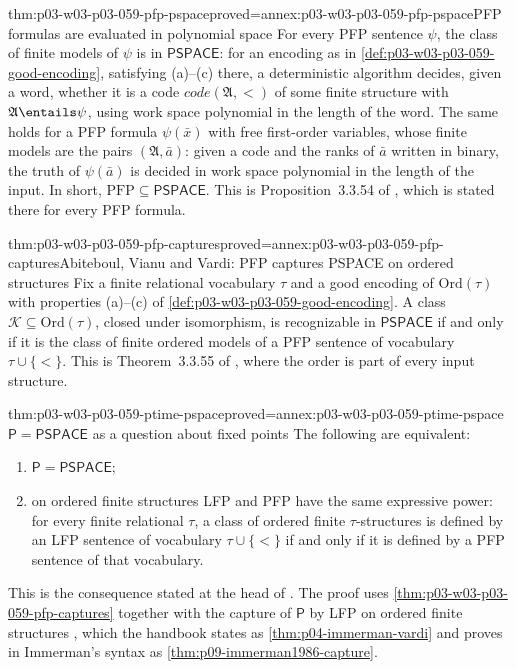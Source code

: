 \begin{hbtheorem}{thm:p03-w03-p03-059-pfp-pspace}{proved=annex:p03-w03-p03-059-pfp-pspace}{PFP formulas are evaluated in polynomial space}
For every PFP sentence \(\psi\), the class of finite models of \(\psi\) is
in \(\mathsf{PSPACE}\): for an encoding as in
\cref{def:p03-w03-p03-059-good-encoding}, satisfying (a)--(c) there, a
deterministic algorithm decides, given a word, whether it is a code
\(\mathit{code}(\mathfrak A,<)\) of some finite structure with
\(\mathfrak A\entails\psi\), using work space polynomial in the length of
the word. The same holds for a PFP formula \(\psi(\bar x)\) with free
first-order variables, whose finite models are the pairs
\((\mathfrak A,\bar a)\): given a code and the ranks of \(\bar a\) written in
binary, the truth of \(\psi(\bar a)\) is decided in work space polynomial in
the length of the input. In short, \(\mathrm{PFP}\subseteq\mathsf{PSPACE}\).
This is Proposition~3.3.54 of \cite[p.~178]{Gradel2007FMTDescriptiveChapter}, which is
stated there for every PFP formula.
\end{hbtheorem}

\begin{hbtheorem}{thm:p03-w03-p03-059-pfp-captures}{proved=annex:p03-w03-p03-059-pfp-captures}{Abiteboul, Vianu and Vardi: PFP captures PSPACE on ordered structures}
Fix a finite relational vocabulary \(\tau\) and a good encoding of
\(\mathrm{Ord}(\tau)\) with properties (a)--(c) of
\cref{def:p03-w03-p03-059-good-encoding}. A class \(\mathcal K\subseteq\mathrm{Ord}(\tau)\),
closed under isomorphism, is recognizable in \(\mathsf{PSPACE}\) if and only
if it is the class of finite ordered models of a PFP sentence of vocabulary
\(\tau\cup\{<\}\). This is Theorem~3.3.55 of
\cite[p.~178]{Gradel2007FMTDescriptiveChapter}, where the order is part of every input
structure.
\end{hbtheorem}

\begin{hbcorollary}{thm:p03-w03-p03-059-ptime-pspace}{proved=annex:p03-w03-p03-059-ptime-pspace}{\(\mathsf P=\mathsf{PSPACE}\) as a question about fixed points}
The following are equivalent:
\begin{enumerate}
 \item \(\mathsf P=\mathsf{PSPACE}\);
 \item on ordered finite structures LFP and PFP have the same expressive
       power: for every finite relational \(\tau\), a class of ordered
       finite \(\tau\)-structures is defined by an LFP sentence of
       vocabulary \(\tau\cup\{<\}\) if and only if it is defined by a PFP
       sentence of that vocabulary.
\end{enumerate}
This is the consequence stated at the head of \cite[p.~180]{Gradel2007FMTDescriptiveChapter}.
The proof uses \cref{thm:p03-w03-p03-059-pfp-captures} together with the
capture of \(\mathsf P\) by LFP on ordered finite structures
\cite[Theorem~3.3.16, p.~157]{Gradel2007FMTDescriptiveChapter}, which the handbook states
as \cref{thm:p04-immerman-vardi} and proves in Immerman's syntax as
\cref{thm:p09-immerman1986-capture}.
\end{hbcorollary}

